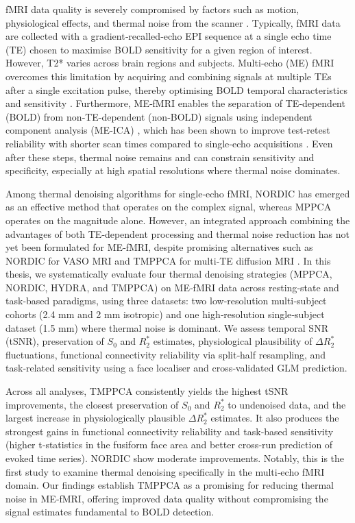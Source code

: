 fMRI data quality is severely compromised by factors such as motion, physiological effects, and thermal noise from the scanner \citep{liu2016}. Typically, fMRI data are collected with a gradient‑recalled‑echo EPI sequence at a single echo time (TE) chosen to maximise BOLD sensitivity for a given region of interest. However, T2* varies across brain regions and subjects. Multi‑echo (ME) fMRI overcomes this limitation by acquiring and combining signals at multiple TEs after a single excitation pulse, thereby optimising BOLD temporal characteristics and sensitivity \citep{kundu2012differentiating}. Furthermore, ME‑fMRI enables the separation of TE‑dependent (BOLD) from non‑TE‑dependent (non‑BOLD) signals using independent component analysis (ME‑ICA) \citep{kundu2012differentiating, dupre2021te}, which has been shown to improve test‑retest reliability with shorter scan times compared to single‑echo acquisitions \citep{lynchRapidPrecisionFunctional2020}. Even after these steps, thermal noise remains and can constrain sensitivity and specificity, especially at high spatial resolutions where thermal noise dominates.

Among thermal denoising algorithms for single‑echo fMRI, NORDIC has emerged as an effective method that operates on the complex signal, whereas MPPCA operates on the magnitude alone. However, an integrated approach combining the advantages of both TE‑dependent processing and thermal noise reduction has not yet been formulated for ME‑fMRI, despite promising alternatives such as NORDIC for VASO MRI \citep{knudsen2025} and TMPPCA for multi‑TE diffusion MRI \citep{olesenTensorDenoisingMultidimensional2023}. In this thesis, we systematically evaluate four thermal denoising strategies (MPPCA, NORDIC, HYDRA, and TMPPCA) on ME‑fMRI data across resting‑state and task‑based paradigms, using three datasets: two low‑resolution multi‑subject cohorts (2.4 mm and 2 mm isotropic) and one high‑resolution single‑subject dataset (1.5 mm) where thermal noise is dominant. We assess temporal SNR (tSNR), preservation of $S_0$ and $R_2^*$ estimates, physiological plausibility of $\Delta R_2^*$ fluctuations, functional connectivity reliability via split‑half resampling, and task‑related sensitivity using a face localiser and cross‑validated GLM prediction.

Across all analyses, TMPPCA consistently yields the highest tSNR improvements, the closest preservation of $S_0$ and $R_2^*$ to undenoised data, and the largest increase in physiologically plausible $\Delta R_2^*$ estimates. It also produces the strongest gains in functional connectivity reliability and task‑based sensitivity (higher t‑statistics in the fusiform face area and better cross‑run prediction of evoked time series). NORDIC  show moderate improvements. Notably, this is the first study to examine thermal denoising specifically in the multi‑echo fMRI domain. Our findings establish TMPPCA as a promising  for reducing thermal noise in ME‑fMRI, offering improved data quality without compromising the signal estimates fundamental to BOLD detection.